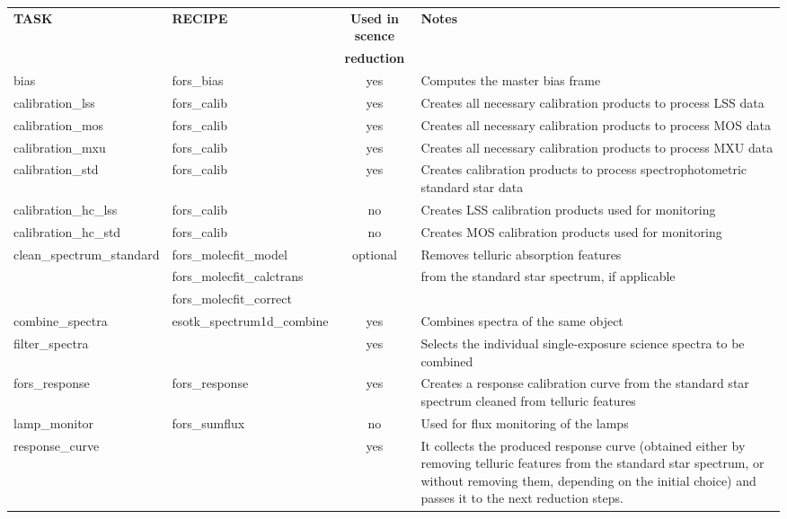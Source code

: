 \begin{table}[htbp]
\centering
\scriptsize
\begin{tabular}{|l|l|c|p{7cm}|}
\hline
\textbf{TASK} & \textbf{RECIPE} & \textbf{Used in scence} & \textbf{Notes} \\
             &                 & \textbf{reduction} &   \\
\hline 
bias 	      & fors\_bias 	     & yes  & Computes the master bias frame \\
calibration\_lss & fors\_calib 	 & yes	& Creates all necessary calibration products to process LSS data \\
calibration\_mos & fors\_calib 	 & yes   & Creates all necessary calibration products to process MOS data \\
calibration\_mxu & fors\_calib 	 & yes	 & Creates all necessary calibration products to process MXU data \\
calibration\_std & fors\_calib 	 & yes   & Creates calibration products to process spectrophotometric standard star data \\
calibration\_hc\_lss & fors\_calib & no  & Creates LSS calibration products used for monitoring \\
calibration\_hc\_std & fors\_calib & no  & Creates MOS calibration products used for monitoring \\
clean\_spectrum\_standard & fors\_molecfit\_model & optional & Removes telluric absorption features \\
     & fors\_molecfit\_calctrans &    & from the standard star spectrum, if applicable\\
     & fors\_molecfit\_correct    &    &    \\
combine\_spectra & esotk\_spectrum1d\_combine & yes & Combines spectra of the same object \\
filter\_spectra &    &  yes & Selects the individual single-exposure science spectra to be combined   \\
fors\_response & fors\_response &  yes & Creates a response calibration curve from the standard star spectrum cleaned from telluric features \\
lamp\_monitor & fors\_sumflux 	   & no  & Used for flux monitoring of the lamps     \\
response\_curve &    & yes & It collects the produced response curve (obtained either by removing telluric features from the standard star spectrum, or without removing them, depending on the initial choice) and passes it to the next reduction steps. \\

\end{tabular}
\end{table}
